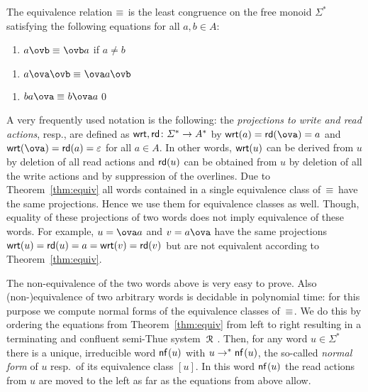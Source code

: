 \begin{theorem}\label{thm:equiv}
	The equivalence relation $\equiv_{}$ is the least congruence on the free monoid $\varSigma^*$ satisfying the following equations for all $a,b\in A$:
	
	\begin{minipage}{0.3\linewidth}
	\begin{enumerate}[(1)]
		\item $a\ovb\equivx\ovb a$ if $a\neq b$\label{thm:equiv:i1}
	\end{enumerate}
   \end{minipage}
   \begin{minipage}{0.3\linewidth}
   	\begin{enumerate}[(1)]
   		\addtocounter{enumi}{1}
   		\item $a\ova\ovb\equivx\ova a\ovb$\label{thm:equiv:i2}
   	\end{enumerate}
   \end{minipage}
   \begin{minipage}{0.3\linewidth}
   	\begin{enumerate}[(1)]
   		\addtocounter{enumi}{2}
   		\item $ba\ova\equivx b\ova a$\label{thm:equiv:i3}\qed
   	\end{enumerate}
   \end{minipage}
\end{theorem}

A very frequently used notation is the following: the \emph{projections to write and read actions}, resp., are defined as $\mathsf{wrt},\mathsf{rd}\colon\varSigma^*\to A^*$ by $\wrt{a}=\rd{\ova}=a$ and $\wrt{\ova}=\rd{a}=\varepsilon$ for all $a\in A$. In other words, $\mathsf{wrt}(u)$ can be derived from $u$ by deletion of all read actions and $\mathsf{rd}(u)$ can be obtained from $u$ by deletion of all the write actions and by suppression of the overlines. Due to Theorem~\ref{thm:equiv} all words contained in a single equivalence class of~$\equiv_{}$ have the same projections. Hence we use them for equivalence classes as well. Though, equality of these projections of two words does not imply equivalence of these words. For example, $u=\ova a$ and $v=a\ova$ have the same projections $\mathsf{wrt}(u)=\mathsf{rd}(u)=a=\mathsf{wrt}(v)=\mathsf{rd}(v)$ but are not equivalent according to Theorem~\ref{thm:equiv}.

The non-equivalence of the two words above is very easy to prove. Also (non-)equivalence of two arbitrary words is decidable in polynomial time: for this purpose we compute normal forms of the equivalence classes of~$\equiv_{}$. We do this by ordering the equations from Theorem~\ref{thm:equiv} from left to right resulting in a terminating and confluent semi-Thue system~$\mathcal{R}_{}$ \cite[Lemma~4.1]{HusKZ17}. Then, for any word $u\in\varSigma^*$ there is a unique, irreducible word $\mathsf{nf}_{}(u)$ with $u\to^*\mathsf{nf}_{}(u)$, the so-called \emph{normal form} of $u$ resp.\ of its equivalence class $[u]$. In this word $\mathsf{nf}_{}(u)$ the read actions from $u$ are moved to the left as far as the equations from above allow.

